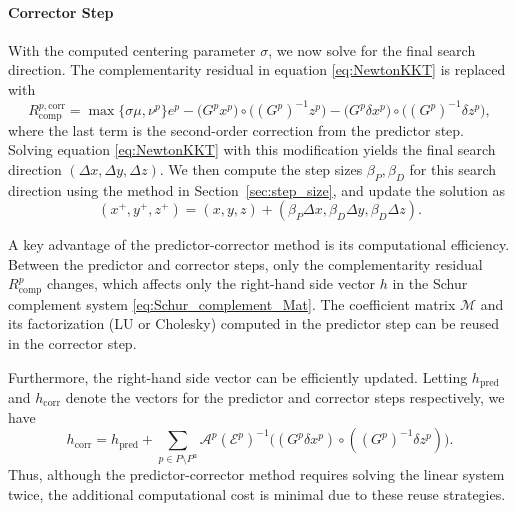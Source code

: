 \paragraph{Corrector Step}
With the computed centering parameter $\sigma$, we now solve for the final search direction.
The complementarity residual in equation \eqref{eq:NewtonKKT} is replaced with
\[R^{p,\text{corr}}_{\text{comp}}=\max\{\sigma \mu, \nu^p\} e^p - \big(G^p x^p\big) \circ\big ((G^p)^{-1} z^p\big) - \big(G^p \delta x^p\big)\circ\big((G^p)^{-1} \delta z^p\big),\]
where the last term is the second-order correction from the predictor step.
Solving equation \eqref{eq:NewtonKKT} with this modification yields the final search direction $(\Delta x, \Delta y, \Delta z)$.
We then compute the step sizes $\beta_P, \beta_D$ for this search direction using the method in Section~\ref{sec:step_size}, and update the solution as
\[(x^+, y^+, z^+) = (x, y, z) + (\beta_P \Delta x, \beta_D \Delta y, \beta_D \Delta z).\]

\medskip
\medskip
A key advantage of the predictor-corrector method is its computational efficiency.
Between the predictor and corrector steps, only the complementarity residual $R^p_{\text{comp}}$ changes, which affects only the right-hand side vector $h$ in the Schur complement system \eqref{eq:Schur_complement_Mat}.
The coefficient matrix $\mathcal{M}$ and its factorization (LU or Cholesky) computed in the predictor step can be reused in the corrector step.

Furthermore, the right-hand side vector can be efficiently updated.
Letting $h_{\text{pred}}$ and $h_{\text{corr}}$ denote the vectors for the predictor and corrector steps respectively, we have
\[h_{\text{corr}}=h_{\text{pred}} + \sum_{p\in P\setminus P^{\text{u}}} \mathcal{A}^p (\mathcal{E}^p)^{-1} \big((G^p \delta x^p) \circ ((G^p)^{-1} \delta z^p) \big).\]
Thus, although the predictor-corrector method requires solving the linear system twice, the additional computational cost is minimal due to these reuse strategies.

